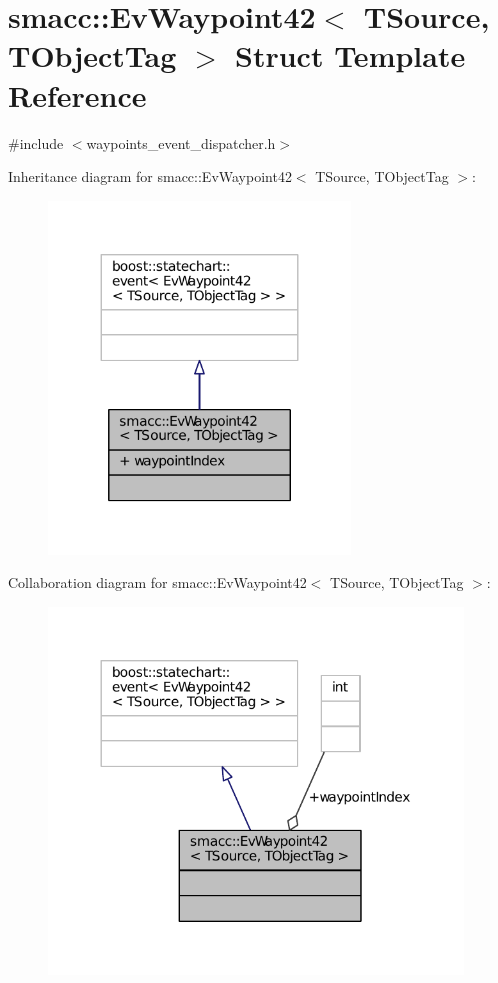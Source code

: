 \hypertarget{structsmacc_1_1EvWaypoint42}{}\section{smacc\+:\+:Ev\+Waypoint42$<$ T\+Source, T\+Object\+Tag $>$ Struct Template Reference}
\label{structsmacc_1_1EvWaypoint42}


{\ttfamily \#include $<$waypoints\+\_\+event\+\_\+dispatcher.\+h$>$}



Inheritance diagram for smacc\+:\+:Ev\+Waypoint42$<$ T\+Source, T\+Object\+Tag $>$\+:
\nopagebreak
\begin{figure}[H]
\begin{center}
\leavevmode
\includegraphics[width=227pt]{structsmacc_1_1EvWaypoint42__inherit__graph}
\end{center}
\end{figure}


Collaboration diagram for smacc\+:\+:Ev\+Waypoint42$<$ T\+Source, T\+Object\+Tag $>$\+:
\nopagebreak
\begin{figure}[H]
\begin{center}
\leavevmode
\includegraphics[width=312pt]{structsmacc_1_1EvWaypoint42__coll__graph}
\end{center}
\end{figure}
